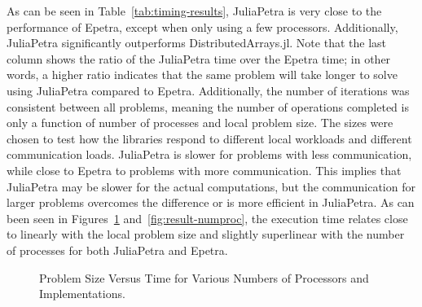 \documentclass[acmsmall]{acmart}
\begin{document}
	As can be seen in Table~\ref{tab:timing-results}, JuliaPetra is very close to the performance of Epetra, except when only using a few processors.
	Additionally, JuliaPetra significantly outperforms DistributedArrays.jl.
	Note that the last column shows the ratio of the JuliaPetra time over the Epetra time; in other words, a higher ratio indicates that the same problem will take longer to solve using JuliaPetra compared to Epetra.
	Additionally, the number of iterations was consistent between all problems, meaning the number of operations completed is only a function of number of processes and local problem size.
	The sizes were chosen to test how the libraries respond to different local workloads and different communication loads.
	JuliaPetra is slower for problems with less communication, while close to Epetra to problems with more communication.
	This implies that JuliaPetra may be slower for the actual computations, but the communication for larger problems overcomes the difference or is more efficient in JuliaPetra.
	As can been seen in Figures~\ref{fig:result-localsize} and~\ref{fig:result-numproc}, the execution time relates close to linearly with the local problem size and slightly superlinear with the number of processes for both JuliaPetra and Epetra.
	
	\begin{figure}
		\caption{Problem Size Versus Time for Various Numbers of Processors and Implementations.}
		\label{fig:result-localsize}
	\end{figure}
	
\end{document}
